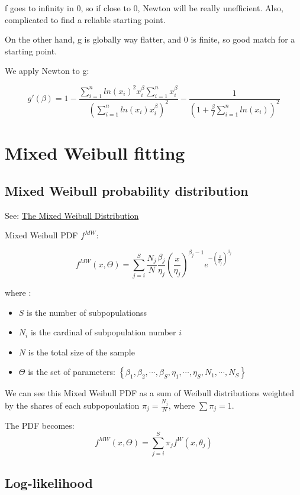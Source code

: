 \documentclass[a4paper,11pt]{article}
\begin{document}
f goes to infinity in 0, so if close to 0, Newton will be really unefficient. 
Also, complicated to find a reliable starting point.

On the other hand, g is globally way flatter, and 0 is finite, so good match for a starting point.


We apply Newton to g:

$$
g'(\beta) = 1 - \frac{\sum\limits_{i=1}^n ln(x_i)^2 x_i^{\beta}\sum\limits_{i=1}^n x_i^{\beta}}{\left(\sum\limits_{i=1}^n ln(x_i) x_i^{\beta}\right)^2} - \frac{1}{\left( 1 + \frac{\beta}{f}\sum\limits_{i=1}^n ln(x_i)\right)^2}
$$

\section{Mixed Weibull fitting}

\subsection{Mixed Weibull probability distribution}

See: \href{http://reliawiki.org/index.php/The_Mixed_Weibull_Distribution}{The Mixed Weibull Distribution}

Mixed Weibull PDF $f^{MW}$:

$$ f^{MW} (x,\Theta) = 
\sum_{j=i}^{S} \frac{N_j}{N}\frac{\beta_j}{\eta_j} \left( \frac{x}{\eta_j} \right)^{\beta_j-1} e^{-(\frac{x}{\eta_j})^{\beta_j}} $$

where :
\begin{itemize}
	\item $S$ is the number of subpopulationss
	\item $N_i$ is the cardinal of subpopulation number $i$
	\item $N$ is the total size of the sample
	\item $\Theta$ is the set of parameters: $ \left\{ \beta_1, \beta_2, \cdots, \beta_S, \eta_1, \cdots, \eta_S, N_1, \cdots, N_S \right\} $ \\

\end{itemize}

We can see this Mixed Weibull PDF as a sum of Weibull distributions weighted by the shares of each subpopoulation $ \pi_j = \frac{N_j}{N} $, where $\sum \pi_j = 1$.

The PDF becomes:
$$  f^{MW} (x,\Theta) = 
\sum_{j=i}^{S} \pi_j f^W (x,\theta_j) $$

\subsection{Log-likelihood}
\end{document}
